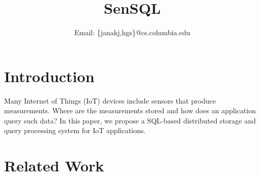 \documentclass[conference,10pt]{IEEEtran}
\newcommand{\papertitle}{SenSQL}
\begin{document}
\title{\papertitle}

\author{
  Email: \{janakj,hgs\}@cs.columbia.edu
}

\maketitle

\begin{abstract}
\end{abstract}

\section{Introduction}
\label{sec:introduction}

Many Internet of Things (IoT) devices include sensors that produce measurements. Where are the measurements stored and how does an application query such data? In this paper, we propose a SQL-based distributed storage and query processing system for IoT applications.

\section{Related Work}
\label{sec:related-work}

\nocite{madden2005tinydb}
\nocite{madden2002supporting}
\nocite{bacon2017spanner}
\nocite{sun2010querying}
\nocite{rfc5222}
\nocite{rfc5582}
\nocite{rfc5012}
\nocite{rfc8428}
\nocite{tsiftes11:sensordb}
\nocite{gupta14:bolt}
\nocite{cockroach-spatial-indexing}



\end{document}
